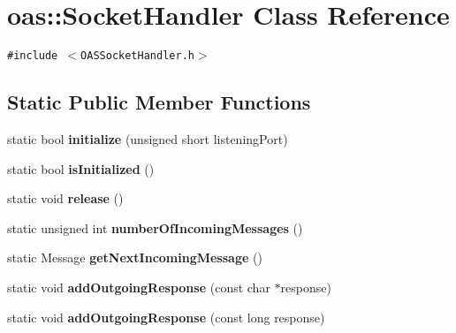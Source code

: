 \section{oas::Socket\-Handler Class Reference}
\label{classoas_1_1SocketHandler}
{\tt \#include $<$OASSocket\-Handler.h$>$}

\subsection*{Static Public Member Functions}
\begin{CompactItemize}
\item 
static bool \textbf{initialize} (unsigned short listening\-Port)\label{classoas_1_1SocketHandler_ef70fab2f4a981420cc0cfbbd79e97c1}

\item 
static bool \textbf{is\-Initialized} ()\label{classoas_1_1SocketHandler_3619045f082f8b1f10a7490d7847f184}

\item 
static void \textbf{release} ()\label{classoas_1_1SocketHandler_dea916af01fe0381f0ab892c77850324}

\item 
static unsigned int \textbf{number\-Of\-Incoming\-Messages} ()\label{classoas_1_1SocketHandler_4fc2f1aa6fe93fdcd5b2942742585001}

\item 
static Message \textbf{get\-Next\-Incoming\-Message} ()\label{classoas_1_1SocketHandler_d2344b19f3aa464b239318fd44313739}

\item 
static void \textbf{add\-Outgoing\-Response} (const char $\ast$response)\label{classoas_1_1SocketHandler_f21ed25414d394a52e509536fb4aa7b4}

\item 
static void \textbf{add\-Outgoing\-Response} (const long response)\label{classoas_1_1SocketHandler_863eeed4ac8cd1c7e16021b8016bab37}

\end{CompactItemize}
